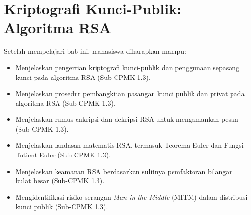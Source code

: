 \documentclass[../../main.tex]{subfiles}
\begin{document}
\chapter{Kriptografi Kunci-Publik: Algoritma RSA}
\label{chap:rsa}

\begin{learningoutcome}
Setelah mempelajari bab ini, mahasiswa diharapkan mampu:
\begin{itemize}
    \item Menjelaskan pengertian kriptografi kunci-publik dan penggunaan sepasang kunci pada algoritma RSA (Sub-CPMK 1.3).
    \item Menjelaskan prosedur pembangkitan pasangan kunci publik dan privat pada algoritma RSA (Sub-CPMK 1.3).
    \item Menjelaskan rumus enkripsi dan dekripsi RSA untuk mengamankan pesan (Sub-CPMK 1.3).
    \item Menjelaskan landasan matematis RSA, termasuk Teorema Euler dan Fungsi Totient Euler (Sub-CPMK 1.3).
    \item Menjelaskan keamanan RSA berdasarkan sulitnya pemfaktoran bilangan bulat besar (Sub-CPMK 1.3).
    \item Mengidentifikasi risiko serangan \textit{Man-in-the-Middle} (MITM) dalam distribusi kunci publik (Sub-CPMK 1.3).
\end{itemize}
\end{learningoutcome}










\end{document}
